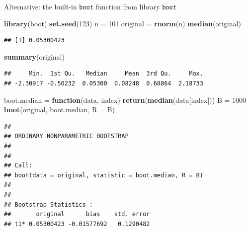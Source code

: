 \documentclass[10pt,ignorenonframetext,]{beamer}
\newenvironment{Shaded}{\begin{snugshade}}{\end{snugshade}}
\newcommand{\KeywordTok}[1]{\textcolor[rgb]{0.13,0.29,0.53}{\textbf{#1}}}
\newcommand{\DataTypeTok}[1]{\textcolor[rgb]{0.13,0.29,0.53}{#1}}
\newcommand{\DecValTok}[1]{\textcolor[rgb]{0.00,0.00,0.81}{#1}}
\newcommand{\StringTok}[1]{\textcolor[rgb]{0.31,0.60,0.02}{#1}}
\newcommand{\ControlFlowTok}[1]{\textcolor[rgb]{0.13,0.29,0.53}{\textbf{#1}}}
\newcommand{\NormalTok}[1]{#1}
\begin{document}
\begin{frame}[fragile]

\begin{block}{Alternative: the built-in \texttt{boot} function from
library \texttt{boot}}

\begin{Shaded}
\begin{Highlighting}[]
\KeywordTok{library}\NormalTok{(boot)}
\KeywordTok{set.seed}\NormalTok{(}\DecValTok{123}\NormalTok{)}
\NormalTok{n =}\StringTok{ }\DecValTok{101}
\NormalTok{original =}\StringTok{ }\KeywordTok{rnorm}\NormalTok{(n)}
\KeywordTok{median}\NormalTok{(original)}
\end{Highlighting}
\end{Shaded}

\begin{verbatim}
## [1] 0.05300423
\end{verbatim}

\begin{Shaded}
\begin{Highlighting}[]
\KeywordTok{summary}\NormalTok{(original)}
\end{Highlighting}
\end{Shaded}

\begin{verbatim}
##     Min.  1st Qu.   Median     Mean  3rd Qu.     Max. 
## -2.30917 -0.50232  0.05300  0.08248  0.68864  2.18733
\end{verbatim}

\end{block}

\end{frame}

\begin{frame}[fragile]

\begin{Shaded}
\begin{Highlighting}[]
\NormalTok{boot.median =}\StringTok{ }\ControlFlowTok{function}\NormalTok{(data, index) }\KeywordTok{return}\NormalTok{(}\KeywordTok{median}\NormalTok{(data[index]))}
\NormalTok{B =}\StringTok{ }\DecValTok{1000}
\KeywordTok{boot}\NormalTok{(original, boot.median, }\DataTypeTok{R =}\NormalTok{ B)}
\end{Highlighting}
\end{Shaded}

\begin{verbatim}
## 
## ORDINARY NONPARAMETRIC BOOTSTRAP
## 
## 
## Call:
## boot(data = original, statistic = boot.median, R = B)
## 
## 
## Bootstrap Statistics :
##       original      bias    std. error
## t1* 0.05300423 -0.01577692   0.1290482
\end{verbatim}

\end{frame}
\end{document}
